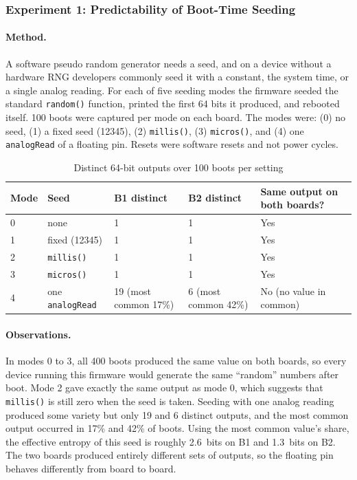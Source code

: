 \documentclass[a4paper, 12pt]{article}
\begin{document}
\subsubsection{Experiment 1: Predictability of Boot-Time Seeding}
 
\paragraph{Method.} A software pseudo random generator needs a seed, and on a device without a hardware RNG developers commonly seed it with a constant, the system time, or a single analog reading. For each of five seeding modes the firmware seeded the standard \texttt{random()} function, printed the first 64 bits it produced, and rebooted itself. 100 boots were captured per mode on each board. The modes were: (0) no seed, (1) a fixed seed (12345), (2) \texttt{millis()}, (3) \texttt{micros()}, and (4) one \texttt{analogRead} of a floating pin. Resets were software resets and not power cycles.
 
 
\begin{table}[htbp]
\centering
\small
\caption{Distinct 64-bit outputs over 100 boots per setting}
\label{tab:bp_e1}
\begin{tabularx}{\textwidth}{@{}llXXX@{}}
\toprule
\textbf{Mode} & \textbf{Seed} & \textbf{B1 distinct} & \textbf{B2 distinct} & \textbf{Same output on both boards?} \\
\midrule
0 & none & 1 & 1 & Yes \\
1 & fixed (12345) & 1 & 1 & Yes \\
2 & \texttt{millis()} & 1 & 1 & Yes \\
3 & \texttt{micros()} & 1 & 1 & Yes \\
4 & one \texttt{analogRead} & 19 (most common 17\%) & 6 (most common 42\%) & No (no value in common) \\
\bottomrule
\end{tabularx}
\end{table}
 
\paragraph{Observations.} In modes 0 to 3, all 400 boots produced the same value on both boards, so every device running this firmware would generate the same ``random'' numbers after boot. Mode 2 gave exactly the same output as mode 0, which suggests that \texttt{millis()} is still zero when the seed is taken. Seeding with one analog reading produced some variety but only 19 and 6 distinct outputs, and the most common output occurred in 17\% and 42\% of boots. Using the most common value's share, the effective entropy of this seed is roughly 2.6~bits on B1 and 1.3~bits on B2. The two boards produced entirely different sets of outputs, so the floating pin behaves differently from board to board.
 
\end{document}
